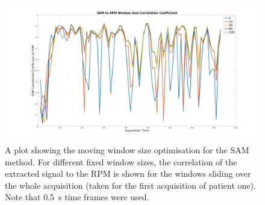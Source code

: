                 \begin{figure}
                    \centering
                    
                    \includegraphics[width=1.0\linewidth]{figures/data_driven_surrogate_signal_extraction_methods_1_sam_window_correlation_coefficient.png}
                    
                    \captionsetup{singlelinecheck=false}
                    \caption{
                        A plot showing the moving window size optimisation for the \gls{SAM} method. For different fixed window sizes, the correlation of the extracted signal  to the \gls{RPM}  is shown for the windows sliding over the whole acquisition (taken for the first acquisition of patient one). Note that \SI{0.5}{s} time frames were used.
                    }
                    \label{fig:pca_data_driven_surrogate_signal_extraction_methods_for_dynamic_pet_methods_sam_window_correlation_coefficient}
                \end{figure}
                
